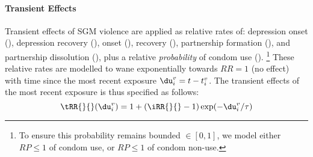 \paragraph{Transient Effects}
Transient effects of SGM violence are applied as relative rates of:
depression onset (),
depression recovery (),
\hazdrink onset (),
\hazdrink recovery (),
partnership formation (), and
partnership dissolution (), plus
a relative \emph{probability} of condom use
().%
\footnote{To ensure this probability remains bounded $\in [0,1]$,
  we model either $RP \le 1$ of condom use, or $RP \le 1$ of condom non-use.}
These relative rates are modelled to wane exponentially towards $RR = 1$
(\ie no effect) with time since the most recent exposure
$\du^v_i = t - t^v_i$.
The transient effects of the most recent exposure is thus specified as follows:
\begin{equation}\label{eq:tRR}
  \tRR{}{}(\du^v_i) = 1+(\iRR{}{}-1)\exp(-\du^v_i/\tau)
\end{equation}
